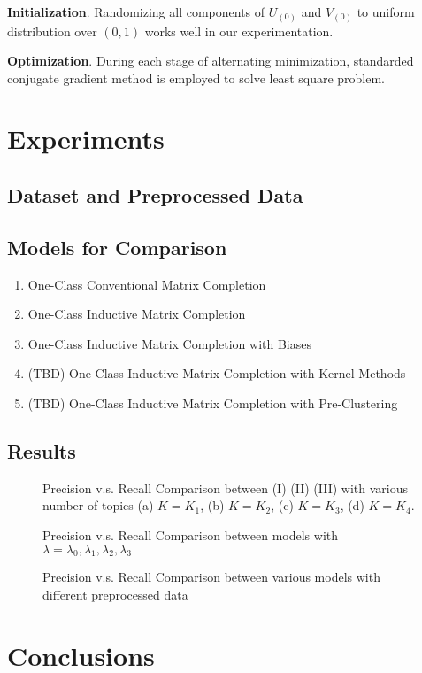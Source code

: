 \documentclass{article} %
\begin{document}
\textbf{Initialization}. Randomizing all components of $U_{(0)}$ and
$V_{(0)}$ to uniform distribution over $(0, 1)$ works well in our
experimentation. 

\textbf{Optimization}.
During each stage of alternating minimization, standarded conjugate gradient method is
employed to solve least square problem. 

\section{Experiments}
\subsection{Dataset and Preprocessed Data} 

\subsection{Models for Comparison}
\renewcommand{\labelenumi}{(\Roman{enumi})}
\begin{enumerate}
    \item One-Class Conventional Matrix Completion
    \item One-Class Inductive Matrix Completion
    \item One-Class Inductive Matrix Completion with Biases
    \item (TBD) One-Class Inductive Matrix Completion with Kernel Methods 
    \item (TBD) One-Class Inductive Matrix Completion with Pre-Clustering
\end{enumerate}

\subsection{Results}


\begin{figure}[h]

    \caption{Precision v.s. Recall Comparison between (I) (II) (III) with various number of topics
        (a) $K=K_1$, (b) $K=K_2$, (c) $K=K_3$, (d) $K=K_4$. }
\end{figure}

\begin{figure}[h]

    \caption{Precision v.s. Recall Comparison between models with
        $\lambda=\lambda_0, \lambda_1,\lambda_2, \lambda_3$ }
\end{figure}

\begin{figure}[h]

    \caption{Precision v.s. Recall Comparison between various models with
        different preprocessed data}
\end{figure}

\section{Conclusions}


{}

\end{document}
